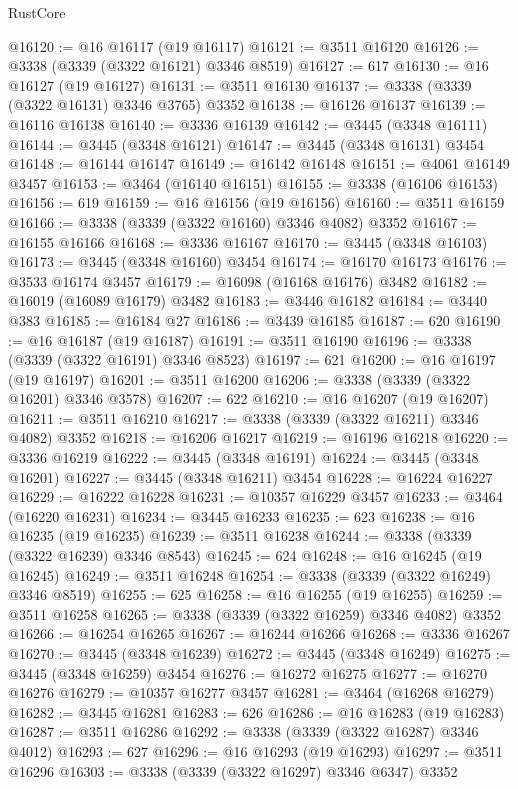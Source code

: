 \begin{lexlean}{RustCore}
\begin{coremodule}
@16120 := @16 @16117 (@19 @16117)
@16121 := @3511 @16120
@16126 := @3338 (@3339 (@3322 @16121) @3346 @8519)
@16127 := 617
@16130 := @16 @16127 (@19 @16127)
@16131 := @3511 @16130
@16137 := @3338 (@3339 (@3322 @16131) @3346 @3765) @3352
@16138 := @16126 @16137
@16139 := @16116 @16138
@16140 := @3336 @16139
@16142 := @3445 (@3348 @16111)
@16144 := @3445 (@3348 @16121)
@16147 := @3445 (@3348 @16131) @3454
@16148 := @16144 @16147
@16149 := @16142 @16148
@16151 := @4061 @16149 @3457
@16153 := @3464 (@16140 @16151)
@16155 := @3338 (@16106 @16153)
@16156 := 619
@16159 := @16 @16156 (@19 @16156)
@16160 := @3511 @16159
@16166 := @3338 (@3339 (@3322 @16160) @3346 @4082) @3352
@16167 := @16155 @16166
@16168 := @3336 @16167
@16170 := @3445 (@3348 @16103)
@16173 := @3445 (@3348 @16160) @3454
@16174 := @16170 @16173
@16176 := @3533 @16174 @3457
@16179 := @16098 (@16168 @16176) @3482
@16182 := @16019 (@16089 @16179) @3482
@16183 := @3446 @16182
@16184 := @3440 @383
@16185 := @16184 @27
@16186 := @3439 @16185
@16187 := 620
@16190 := @16 @16187 (@19 @16187)
@16191 := @3511 @16190
@16196 := @3338 (@3339 (@3322 @16191) @3346 @8523)
@16197 := 621
@16200 := @16 @16197 (@19 @16197)
@16201 := @3511 @16200
@16206 := @3338 (@3339 (@3322 @16201) @3346 @3578)
@16207 := 622
@16210 := @16 @16207 (@19 @16207)
@16211 := @3511 @16210
@16217 := @3338 (@3339 (@3322 @16211) @3346 @4082) @3352
@16218 := @16206 @16217
@16219 := @16196 @16218
@16220 := @3336 @16219
@16222 := @3445 (@3348 @16191)
@16224 := @3445 (@3348 @16201)
@16227 := @3445 (@3348 @16211) @3454
@16228 := @16224 @16227
@16229 := @16222 @16228
@16231 := @10357 @16229 @3457
@16233 := @3464 (@16220 @16231)
@16234 := @3445 @16233
@16235 := 623
@16238 := @16 @16235 (@19 @16235)
@16239 := @3511 @16238
@16244 := @3338 (@3339 (@3322 @16239) @3346 @8543)
@16245 := 624
@16248 := @16 @16245 (@19 @16245)
@16249 := @3511 @16248
@16254 := @3338 (@3339 (@3322 @16249) @3346 @8519)
@16255 := 625
@16258 := @16 @16255 (@19 @16255)
@16259 := @3511 @16258
@16265 := @3338 (@3339 (@3322 @16259) @3346 @4082) @3352
@16266 := @16254 @16265
@16267 := @16244 @16266
@16268 := @3336 @16267
@16270 := @3445 (@3348 @16239)
@16272 := @3445 (@3348 @16249)
@16275 := @3445 (@3348 @16259) @3454
@16276 := @16272 @16275
@16277 := @16270 @16276
@16279 := @10357 @16277 @3457
@16281 := @3464 (@16268 @16279)
@16282 := @3445 @16281
@16283 := 626
@16286 := @16 @16283 (@19 @16283)
@16287 := @3511 @16286
@16292 := @3338 (@3339 (@3322 @16287) @3346 @4012)
@16293 := 627
@16296 := @16 @16293 (@19 @16293)
@16297 := @3511 @16296
@16303 := @3338 (@3339 (@3322 @16297) @3346 @6347) @3352

\end{coremodule}
\end{lexlean}

